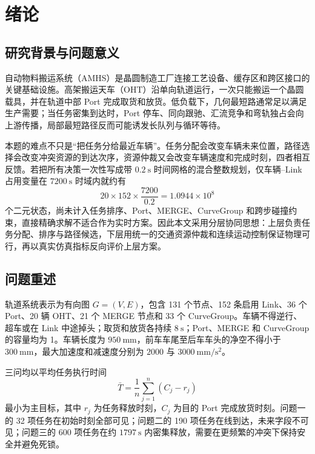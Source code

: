 \documentclass[UTF8]{ctexart}
\begin{document}
\pagestyle{plain}
\newpage
\begingroup
\small
\tableofcontents
\endgroup
\newpage

\section{绪论}
\subsection{研究背景与问题意义}

自动物料搬运系统（AMHS）是晶圆制造工厂连接工艺设备、缓存区和跨区接口的关键基础设施。高架搬运天车（OHT）沿单向轨道运行，一次只能搬运一个晶圆载具，并在轨道中部 Port 完成取货和放货。低负载下，几何最短路通常足以满足生产需要；当任务密集到达时，Port 停车、同向跟驰、汇流竞争和弯轨独占会向上游传播，局部最短路径反而可能诱发长队列与循环等待。

本题的难点不只是“把任务分给最近车辆”。任务分配会改变车辆未来位置，路径选择会改变冲突资源的到达次序，资源仲裁又会改变车辆速度和完成时刻，四者相互反馈。若把所有决策一次性写成带 $0.2\ \mathrm{s}$ 时间网格的混合整数规划，仅车辆--Link 占用变量在 $7200\ \mathrm{s}$ 时域内就约有
\begin{equation}
20\times152\times\frac{7200}{0.2}=1.0944\times10^8
\end{equation}
个二元状态，尚未计入任务排序、Port、MERGE、CurveGroup 和跨步碰撞约束，直接精确求解不适合作为实时方案。因此本文采用分层协同思想：上层负责任务分配、排序与路径候选，下层用统一的交通资源仲裁和连续运动控制保证物理可行，再以真实仿真指标反向评价上层方案。

\subsection{问题重述}

轨道系统表示为有向图 $G=(V,E)$，包含 131 个节点、152 条启用 Link、36 个 Port、20 辆 OHT、21 个 MERGE 节点和 33 个 CurveGroup。车辆不得逆行、超车或在 Link 中途掉头；取货和放货各持续 $8\ \mathrm{s}$；Port、MERGE 和 CurveGroup 的容量均为 1。车辆长度为 $950\ \mathrm{mm}$，前车车尾至后车车头的净空不得小于 $300\ \mathrm{mm}$，最大加速度和减速度分别为 $2000$ 与 $3000\ \mathrm{mm/s^2}$。

三问均以平均任务执行时间
\begin{equation}\label{eq:official-objective}
\bar T=\frac{1}{n}\sum_{j=1}^{n}(C_j-r_j)
\end{equation}
最小为主目标，其中 $r_j$ 为任务释放时刻，$C_j$ 为目的 Port 完成放货时刻。问题一的 32 项任务在初始时刻全部可见；问题二的 190 项任务在线到达，未来字段不可见；问题三的 600 项任务在约 $1797\ \mathrm{s}$ 内密集释放，需要在更频繁的冲突下保持安全并避免死锁。
\end{document}

